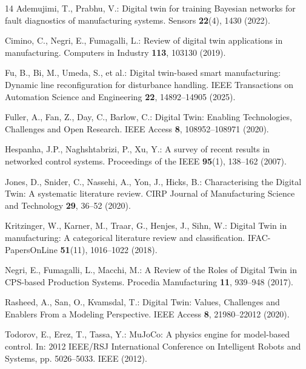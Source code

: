 \begin{thebibliography}{14}
Ademujimi, T., Prabhu, V.: Digital twin for training Bayesian networks for fault diagnostics of manufacturing systems. Sensors \textbf{22}(4), 1430 (2022). 

Cimino, C., Negri, E., Fumagalli, L.: Review of digital twin applications in manufacturing. Computers in Industry \textbf{113}, 103130 (2019). 

Fu, B., Bi, M., Umeda, S., et al.: Digital twin-based smart manufacturing: Dynamic line reconfiguration for disturbance handling. IEEE Transactions on Automation Science and Engineering \textbf{22}, 14892--14905 (2025). 

Fuller, A., Fan, Z., Day, C., Barlow, C.: Digital Twin: Enabling Technologies, Challenges and Open Research. IEEE Access \textbf{8}, 108952--108971 (2020). 

Hespanha, J.P., Naghshtabrizi, P., Xu, Y.: A survey of recent results in networked control systems. Proceedings of the IEEE \textbf{95}(1), 138--162 (2007). 

Jones, D., Snider, C., Nassehi, A., Yon, J., Hicks, B.: Characterising the Digital Twin: A systematic literature review. CIRP Journal of Manufacturing Science and Technology \textbf{29}, 36--52 (2020). 

Kritzinger, W., Karner, M., Traar, G., Henjes, J., Sihn, W.: Digital Twin in manufacturing: A categorical literature review and classification. IFAC-PapersOnLine \textbf{51}(11), 1016--1022 (2018). 

Negri, E., Fumagalli, L., Macchi, M.: A Review of the Roles of Digital Twin in CPS-based Production Systems. Procedia Manufacturing \textbf{11}, 939--948 (2017). 

Rasheed, A., San, O., Kvamsdal, T.: Digital Twin: Values, Challenges and Enablers From a Modeling Perspective. IEEE Access \textbf{8}, 21980--22012 (2020). 

Todorov, E., Erez, T., Tassa, Y.: MuJoCo: A physics engine for model-based control. In: 2012 IEEE/RSJ International Conference on Intelligent Robots and Systems, pp. 5026--5033. IEEE (2012). 


\end{thebibliography}
